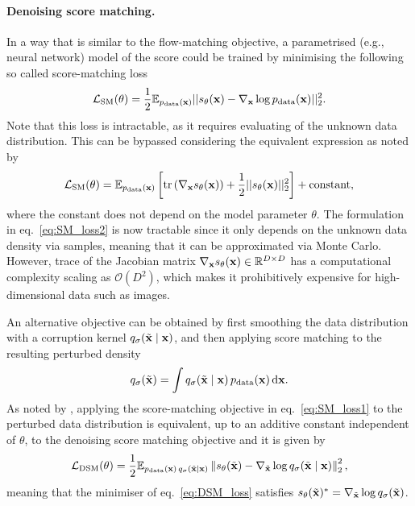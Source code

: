 \paragraph{Denoising score matching.} In a way that is similar to the flow-matching objective, a parametrised (e.g., neural network) model of the score could be trained by minimising the following so called score-matching loss
\begin{equation}
    \label{eq:SM_loss1}
    {\mathcal L}_{\text{SM}}(\theta) = 
    \frac{1}{2}
    \mathbb{E}_{p_\text{data}({ \mathbf{x}})}||s_\theta({ \mathbf{x}}) - \nabla_{ \mathbf{x}}\log p_\text{data}({ \mathbf{x}})||_2^2.
\end{equation}
Note that this loss is intractable, as it requires evaluating of the unknown data distribution. This can be bypassed considering the equivalent expression as noted by \cite[Thm.~1]{hyvarinen2005score}
\begin{equation}
     \label{eq:SM_loss2}
    {\mathcal L}_{\text{SM}}(\theta) 
    =
    \mathbb{E}_{p_\text{data}({ \mathbf{x}})}\left[\operatorname{tr}{(\nabla_{ \mathbf{x}} s_\theta({ \mathbf{x}}))} + \frac{1}{2}||s_\theta({ \mathbf{x}})||_2^2\right] + \text{constant},
\end{equation}
where the constant does not depend on the model parameter $\theta$. The formulation in eq.~\eqref{eq:SM_loss2} is now tractable since it only depends on the unknown data density via samples, meaning that it can be approximated via Monte Carlo. However, trace of the Jacobian matrix $\nabla_{{ \mathbf{x}}}s_\theta({ \mathbf{x}})\in{\mathbb R}^{D\times D}$ has a computational complexity scaling as $\mathcal O(D^2)$, which makes it prohibitively expensive for high-dimensional data such as images. 

An alternative objective can be obtained by first smoothing the data distribution with a corruption kernel \(q_\sigma(\tilde{{ \mathbf{x}}}\mid { \mathbf{x}})\), and then applying score matching to the resulting perturbed density
\begin{equation}
    \label{eq:perturbed_marginal}
    q_\sigma(\tilde{{ \mathbf{x}}})=\int q_\sigma(\tilde{{ \mathbf{x}}}\mid { \mathbf{x}})\,p_{\mathrm{data}}({ \mathbf{x}})\,{\text{d}}{ \mathbf{x}}.    
\end{equation}
As noted by \cite{vincent2011connection}, applying the score-matching objective in eq.~\eqref{eq:SM_loss1} to the perturbed data distribution is equivalent, up to an additive constant independent of \(\theta\), to the denoising score matching objective and it is given by
\begin{equation}
    \label{eq:DSM_loss}
    {\mathcal L}_{\text{DSM}}(\theta) =
    \frac{1}{2}
    \mathbb{E}_{p_{\text{data}}({ \mathbf{x}})\, q_\sigma(\tilde{{ \mathbf{x}}}\mid{ \mathbf{x}})}
    \left\|
    s_\theta(\tilde{{ \mathbf{x}}}) -
    \nabla_{\tilde{{ \mathbf{x}}}} \log q_\sigma(\tilde{{ \mathbf{x}}}\mid{ \mathbf{x}})
    \right\|_2^2,
\end{equation}
meaning that the minimiser of eq.~\eqref{eq:DSM_loss} satisfies $s_\theta(\tilde{{ \mathbf{x}}})^*=\nabla_{\tilde{{ \mathbf{x}}}}\log q_\sigma(\tilde{{ \mathbf{x}}})$. 

